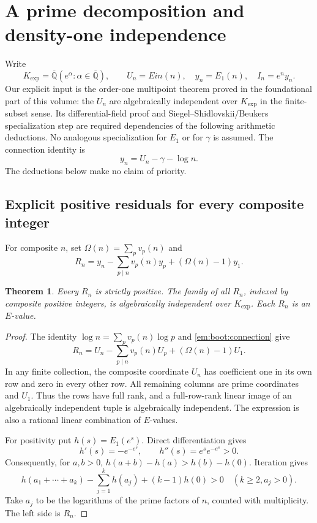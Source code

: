 \documentclass[11pt,a4paper]{article}
\newtheorem{theorem}{Theorem}[section]
\theoremstyle{definition}
\theoremstyle{remark}
\theoremstyle{plain}
\numberwithin{equation}{section}
\def\operatorname#1{#1}\def\mathrm#1{#1}}
\begin{document}
\section{A prime decomposition and density-one independence}
\label{em:sec:bootstrap}

Write
\[
 K_{\exp}=\overline{\mathbb Q}(e^\alpha:
       \alpha\in\overline{\mathbb Q}),\qquad
 U_n=\operatorname{Ein}(n),\quad y_n=E_1(n),\quad I_n=e^ny_n.
\]
Our explicit input is the order-one multipoint theorem proved in the
foundational part of this volume: the $U_n$ are algebraically independent over $K_{\exp}$ in
the finite-subset sense. Its differential-field proof and
Siegel--Shidlovskii/Beukers specialization step are required dependencies
of the following arithmetic deductions. No analogous specialization for $E_1$
or for $\gamma$ is assumed. The connection identity is
\begin{equation}\label{em:boot:connection}
 y_n=U_n-\gamma-\log n.
\end{equation}
The deductions below make no claim of priority.

\subsection{Explicit positive residuals for every composite integer}
For composite $n$, set $\Omega(n)=\sum_pv_p(n)$ and
\begin{equation}\label{em:boot:residual}
 R_n=y_n-\sum_{p\mid n}v_p(n)y_p+(\Omega(n)-1)y_1.
\end{equation}

\begin{theorem}\label{em:boot:composites}
Every $R_n$ is strictly positive. The family of all $R_n$, indexed by
composite positive integers, is algebraically independent over
$K_{\exp}$. Each $R_n$ is an $E$-value.
\end{theorem}
\begin{proof}
The identity $\log n=\sum_pv_p(n)\log p$ and
\eqref{em:boot:connection} give
\[
 R_n=U_n-\sum_{p\mid n}v_p(n)U_p+(\Omega(n)-1)U_1.
\]
In any finite collection, the composite coordinate $U_n$ has coefficient
one in its own row and zero in every other row. All remaining columns
are prime coordinates and $U_1$. Thus the rows have full rank, and a
full-row-rank linear image of an algebraically independent tuple is
algebraically independent. The expression is also a rational linear
combination of $E$-values.

For positivity put $h(s)=E_1(e^s)$. Direct differentiation gives
\[
 h'(s)=-e^{-e^s},\qquad h''(s)=e^se^{-e^s}>0.
\]
Consequently, for $a,b>0$,
$h(a+b)-h(a)>h(b)-h(0)$. Iteration gives
\[
 h(a_1+\cdots+a_k)-\sum_{j=1}^k h(a_j)+(k-1)h(0)>0
 \quad(k\ge2, a_j>0).
\]
Take $a_j$ to be the logarithms of the prime factors of $n$, counted
with multiplicity. The left side is $R_n$.
\end{proof}
\end{document}
